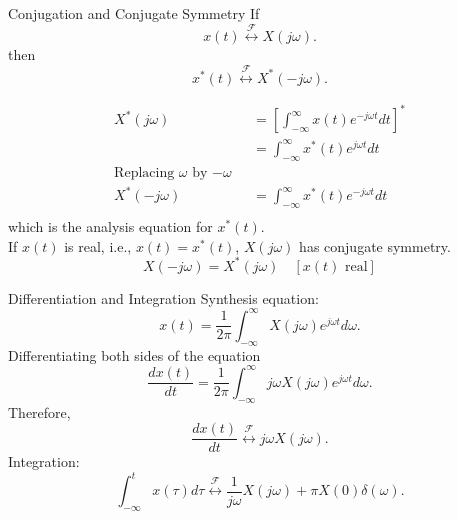 \begin{frame}{Conjugation and Conjugate Symmetry}
    If
    \begin{equation*}
        x(t)  \overset{\mathcal{F}}{\longleftrightarrow}  X(j\omega).
    \end{equation*}
    then
    \begin{equation*}
        x^\ast(t)  \overset{\mathcal{F}}{\longleftrightarrow}  X^\ast(-j\omega).
    \end{equation*}

    {
        \begin{align*}
            X^\ast(j\omega) &= \left[\int_{-\infty}^{\infty}x(t)e^{-j\omega t} dt \right]^\ast\\
            &= \int_{-\infty}^{\infty}x^\ast(t)e^{j\omega t} dt\\
            \text{Replacing $\omega$ by $-\omega$ }\\
            X^\ast(-j\omega) &= \int_{-\infty}^{\infty}x^\ast(t)e^{-j\omega t} dt\\
        \end{align*}
        which is the analysis equation for $x^\ast(t)$.\\

        If $x(t)$ is real, i.e., $x(t) = x^\ast(t)$, $X(j\omega)$ has conjugate symmetry.
        \begin{equation*}
            X(-j\omega) = X^\ast(j\omega)\quad [x(t) \text{ real}]
        \end{equation*}
    }


\end{frame}

\begin{frame}{Differentiation and Integration}
    Synthesis equation:
    \begin{equation*}
        x(t) = \frac{1}{2\pi}\int_{-\infty}^{\infty}X(j\omega)e^{j\omega t} d\omega.
    \end{equation*}
    Differentiating both  sides of the equation
    \begin{equation*}
        \frac{dx(t)}{dt} = \frac{1}{2\pi}\int_{-\infty}^{\infty}j\omega X(j\omega)e^{j\omega t} d\omega.
    \end{equation*}
    Therefore,
    \begin{equation*}
        \frac{dx(t)}{dt}  \overset{\mathcal{F}}{\longleftrightarrow}  j\omega X(j\omega).
    \end{equation*}
    Integration:
    \begin{equation*}
        \int_{-\infty}^{t} x(\tau)d\tau \overset{\mathcal{F}}{\longleftrightarrow} \frac{1}{ j\omega} X(j\omega) + \pi X(0)\delta(\omega).
    \end{equation*}
\end{frame}


